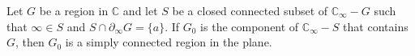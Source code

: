 Let $G$ be a region in $\mathbb{C}$ and let $S$ be a closed connected subset of $\mathbb{C}_\infty - G$ such that $\infty \in S$ and $S \cap \partial_\infty G = \{a\}$. If $G_0$ is the component of $\mathbb{C}_\infty - S$ that contains $G$, then $G_0$ is a simply connected region in the plane.
